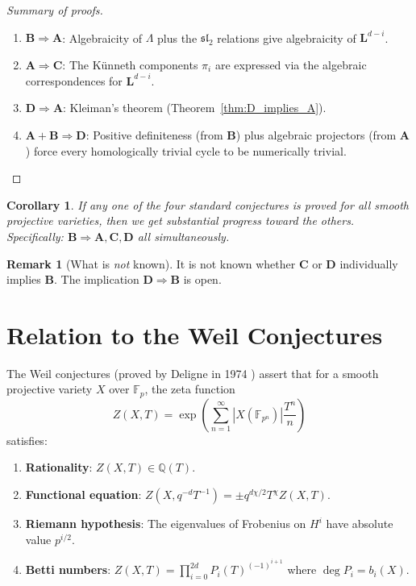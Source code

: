 \documentclass[12pt,a4paper]{amsart}
\newtheorem{corollary}[theorem]{Corollary}
\theoremstyle{definition}
\newtheorem{remark}[theorem]{Remark}
\newcommand{\Q}{\mathbb{Q}}
\newcommand{\Fp}{\mathbb{F}_p}
\begin{document}
\begin{proof}[Summary of proofs]
\begin{enumerate}[label=(\roman*)]
  \item $\mathbf{B} \Rightarrow \mathbf{A}$: Algebraicity of $\Lambda$ plus
        the $\mathfrak{sl}_2$ relations give algebraicity of $\mathbf{L}^{d-i}$.
  \item $\mathbf{A} \Rightarrow \mathbf{C}$: The K\"unneth components $\pi_i$
        are expressed via the algebraic correspondences for $\mathbf{L}^{d-i}$.
  \item $\mathbf{D} \Rightarrow \mathbf{A}$: Kleiman's theorem
        (Theorem~\ref{thm:D_implies_A}).
  \item $\mathbf{A} + \mathbf{B} \Rightarrow \mathbf{D}$: Positive
        definiteness (from $\mathbf{B}$) plus algebraic projectors (from $\mathbf{A}$)
        force every homologically trivial cycle to be numerically trivial.
\end{enumerate}
\end{proof}

\begin{corollary}
If any one of the four standard conjectures is proved for \emph{all} smooth
projective varieties, then we get substantial progress toward the others.
Specifically: $\mathbf{B} \Rightarrow \mathbf{A}, \mathbf{C}, \mathbf{D}$
all simultaneously.
\end{corollary}

\begin{remark}[What is \emph{not} known]
It is not known whether $\mathbf{C}$ or $\mathbf{D}$ individually implies
$\mathbf{B}$.  The implication $\mathbf{D} \Rightarrow \mathbf{B}$ is open.
\end{remark}

\section{Relation to the Weil Conjectures}\label{sec:weilconj}

The Weil conjectures (proved by Deligne in 1974 \cite{deligne1974}) assert that
for a smooth projective variety $X$ over $\Fp$, the zeta function
\[
  Z(X, T) = \exp\!\left(\sum_{n=1}^\infty |X(\mathbb{F}_{p^n})| \frac{T^n}{n}\right)
\]
satisfies:
\begin{enumerate}[label=(\roman*)]
  \item \textbf{Rationality}: $Z(X,T) \in \Q(T)$.
  \item \textbf{Functional equation}: $Z(X, q^{-d}T^{-1}) = \pm q^{d\chi/2} T^\chi Z(X,T)$.
  \item \textbf{Riemann hypothesis}: The eigenvalues of Frobenius on $H^i$ have
        absolute value $p^{i/2}$.
  \item \textbf{Betti numbers}: $Z(X,T) = \prod_{i=0}^{2d} P_i(T)^{(-1)^{i+1}}$
        where $\deg P_i = b_i(X)$.
\end{enumerate}
\end{document}
